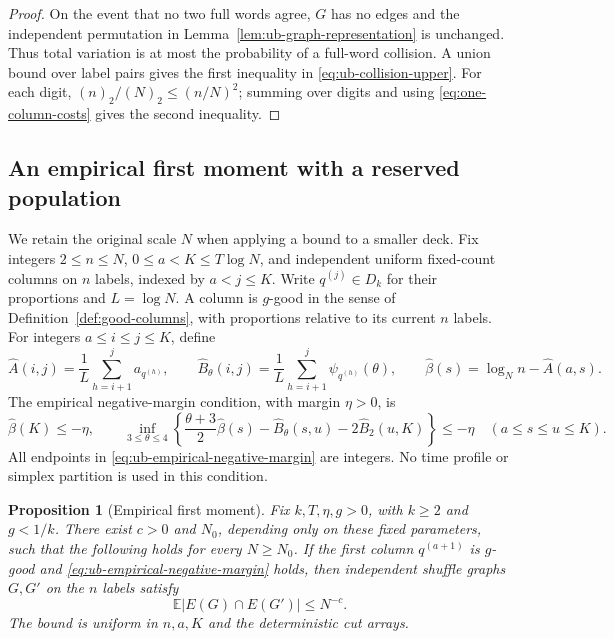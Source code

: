 \documentclass[11pt]{article}
\numberwithin{equation}{section}
\newtheorem{proposition}[proposition]{Proposition}
\newcommand{\E}{\mathbb E}
\newcommand{\1}{\mathbf 1}
\begin{document}
\begin{proof}
On the event that no two full words agree, $G$ has no edges and the
independent permutation in Lemma~\ref{lem:ub-graph-representation} is
unchanged. Thus total variation is at most the probability of a full-word
collision. A union bound over label pairs gives the first inequality in
\eqref{eq:ub-collision-upper}. For each digit,
$(n)_2/(N)_2\le(n/N)^2$; summing over digits and using
\eqref{eq:one-column-costs} gives the second inequality.
\end{proof}

\subsection{An empirical first moment with a reserved population}

We retain the original scale $N$ when applying a bound to a smaller deck.
Fix integers $2\le n\le N$, $0\le a<K\le T\log N$, and independent
uniform fixed-count columns on $n$ labels, indexed by $a<j\le K$.
Write $q^{(j)}\in D_k$ for their proportions and $L=\log N$.
A column is $g$-good in the sense of Definition~\ref{def:good-columns},
with proportions relative to its current $n$ labels. For integers
$a\le i\le j\le K$, define
\begin{equation}
\label{eq:ub-empirical-costs}
 \widehat A(i,j)=\frac1L\sum_{h=i+1}^j a_{q^{(h)}},\qquad
 \widehat B_\theta(i,j)=\frac1L\sum_{h=i+1}^j\psi_{q^{(h)}}(\theta),
 \qquad \widehat\beta(s)=\log_N n-\widehat A(a,s).
\end{equation}
The empirical negative-margin condition, with margin $\eta>0$, is
\begin{equation}
\label{eq:ub-empirical-negative-margin}
 \widehat\beta(K)\le-\eta,\qquad
 \inf_{3\le\theta\le4}
 \left\{\frac{\theta+3}{2}\widehat\beta(s)
       -\widehat B_\theta(s,u)-2\widehat B_2(u,K)\right\}
 \le-\eta\quad(a\le s\le u\le K).
\end{equation}
All endpoints in \eqref{eq:ub-empirical-negative-margin} are integers.
No time profile or simplex partition is used in this condition.

\begin{proposition}[Empirical first moment]
\label{prop:ub-empirical-first-moment}
\label{prop:ub-first-moment}
Fix $k,T,\eta,g>0$, with $k\ge2$ and $g<1/k$.
There exist $c>0$ and $N_0$, depending only on these fixed parameters,
such that the following holds for every $N\ge N_0$. If the first column
$q^{(a+1)}$ is $g$-good and
\eqref{eq:ub-empirical-negative-margin} holds, then independent shuffle
graphs $G,G'$ on the $n$ labels satisfy
\begin{equation}
\label{eq:ub-empirical-first-moment}
 \E|E(G)\cap E(G')|\le N^{-c}.
\end{equation}
The bound is uniform in $n,a,K$ and the deterministic cut arrays.
\end{proposition}
\end{document}
